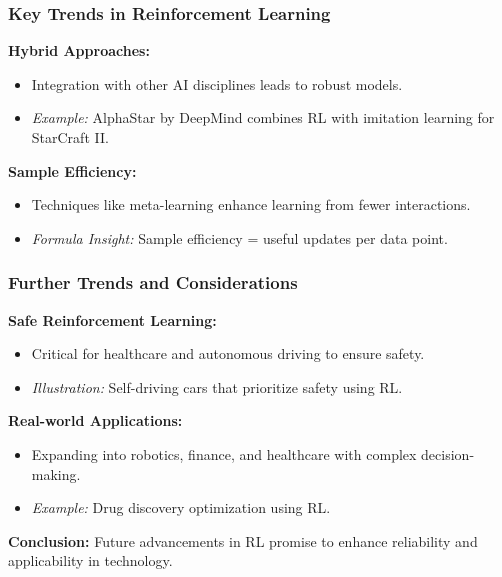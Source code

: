 \documentclass[aspectratio=169]{beamer}
\begin{document}
\begin{frame}[fragile]
    \frametitle{Key Trends in Reinforcement Learning}
    \textbf{Hybrid Approaches:}
    \begin{itemize}
        \item Integration with other AI disciplines leads to robust models.
        \item \textit{Example:} AlphaStar by DeepMind combines RL with imitation learning for StarCraft II.
    \end{itemize}
    
    \textbf{Sample Efficiency:}
    \begin{itemize}
        \item Techniques like meta-learning enhance learning from fewer interactions.
        \item \textit{Formula Insight:} Sample efficiency = useful updates per data point.
    \end{itemize}
\end{frame}

\begin{frame}[fragile]
    \frametitle{Further Trends and Considerations}
    \textbf{Safe Reinforcement Learning:}
    \begin{itemize}
        \item Critical for healthcare and autonomous driving to ensure safety.
        \item \textit{Illustration:} Self-driving cars that prioritize safety using RL.
    \end{itemize}

    \textbf{Real-world Applications:}
    \begin{itemize}
        \item Expanding into robotics, finance, and healthcare with complex decision-making.
        \item \textit{Example:} Drug discovery optimization using RL.
    \end{itemize}

    \textbf{Conclusion:}
    Future advancements in RL promise to enhance reliability and applicability in technology.
\end{frame}
\end{document}
